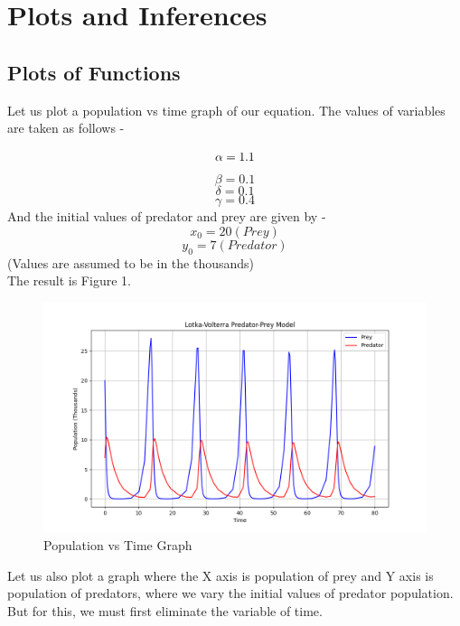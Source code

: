 \documentclass{article}
\begin{document}
\section{Plots and Inferences}
\subsection{Plots of Functions}
Let us plot a population vs time graph of our equation. The values of variables are taken as follows - 

\[\alpha = 1.1\\\]
\[\beta = 0.1\]
\[\delta = 0.1\]
\[\gamma = 0.4\]
And the initial values of predator and prey are given by - 
\[x_0 = 20 (Prey)\]
\[y_0 = 7 (Predator)\]
(Values are assumed to be in the thousands)\\
The result is Figure 1.

\begin{figure}[H]
    \centering
    \includegraphics[width=0.75\linewidth]{LV_Time.png}
    \caption{Population vs Time Graph}
    \label{fig:1}
\end{figure}
Let us also plot a graph where the X axis is population of prey and Y axis is population of predators, where we vary the initial values of predator population. But for this, we must first eliminate the variable of time.  
\end{document}
